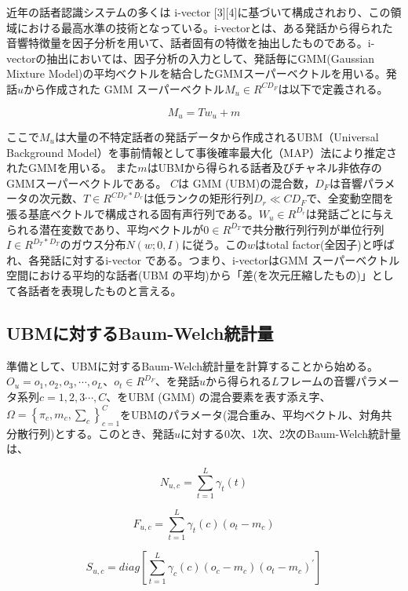 近年の話者認識システムの多くは i-vector [3][4]に基づいて構成されおり、この領域における最高水準の技術となっている。i-vectorとは、ある発話から得られた音響特徴量を因子分析を用いて、話者固有の特徴を抽出したものである。i-vectorの抽出においては、因子分析の入力として、発話毎にGMM(Gaussian Mixture Model)の平均ベクトルを結合したGMMスーパーベクトルを用いる。発話$u$から作成された GMM スーパーベクトル$M_u∈R^{CD_F}$は以下で定義される。

\begin{equation}
M_u=T w_u + m
\end{equation}

ここで$M_u$は大量の不特定話者の発話データから作成されるUBM（Universal Background Model）を事前情報として事後確率最大化（MAP）法により推定されたGMMを用いる。
また$m$はUBMから得られる話者及びチャネル非依存のGMMスーパーベクトルである。
$C$は GMM (UBM)の混合数，$D_F$は音響パラメータの次元数、$T∈R^{CD_F*D_r}$は低ランクの矩形行列$D_r \ll CD_F$で、全変動空間を張る基底ベクトルで構成される固有声行列である。$W_u \in R^{D_r}$は発話ごとに与えられる潜在変数であり、平均ベクトルが$0 \in R^{D_T}$で共分散行列行列が単位行列$I \in R^{D_T*D_T}$のガウス分布$N(w ; 0,I)$に従う。この$w$はtotal factor(全因子)と呼ばれ、各発話に対するi-vector である。つまり、i-vectorはGMM スーパーベクトル空間における平均的な話者(UBM の平均)から「差(を次元圧縮したもの)」として各話者を表現したものと言える。

\subsection{UBMに対するBaum-Welch統計量}
準備として、UBMに対するBaum-Welch統計量を計算することから始める。
$O_u={o_1,o_2,o_3,\cdots,o_L}$、$o_t\in R^{D_F}$、を発話$u$から得られる$L$フレームの音響パラメータ系列$c=1,2,3\cdots,C$、をUBM (GMM) の混合要素を表す添え字、$\Omega=\left\{\pi_c,m_c,\sum_{c}\right\}_{c=1}^{C}$をUBMのパラメータ(混合重み、平均ベクトル、対角共分散行列)とする。このとき、発話$u$に対する0次、1次、2次のBaum-Welch統計量は、

\begin{equation}
N_{u,c}=\sum_{t=1}^{L}\gamma_t(t)
\end{equation}

\begin{equation}
F_{u,c}=\sum_{t=1}^{L}\gamma_t(c)(o_t-m_c)
\end{equation}

\begin{equation}
S_{u,c}=diag\left[\sum_{t=1}^L\gamma_c(c)(o_c-m_c)(o_t-m_c)^\prime\right]
\end{equation}



